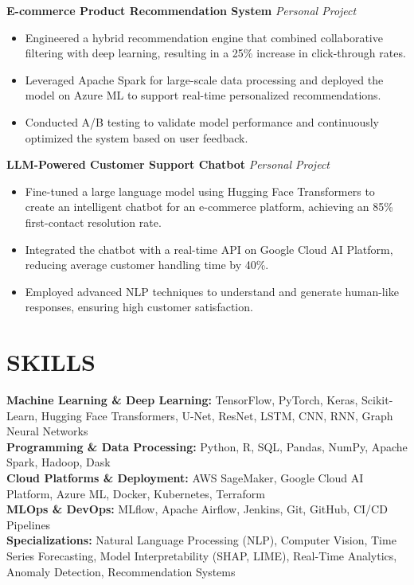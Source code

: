 \documentclass[12pt,a4paper]{article}
\begin{document}
\textbf{E-commerce Product Recommendation System} \hfill \textit{Personal Project}\\
\begin{itemize}[leftmargin=*,noitemsep,topsep=0pt]
  \item Engineered a hybrid recommendation engine that combined collaborative filtering with deep learning, resulting in a 25\% increase in click-through rates.
  \item Leveraged Apache Spark for large-scale data processing and deployed the model on Azure ML to support real-time personalized recommendations.
  \item Conducted A/B testing to validate model performance and continuously optimized the system based on user feedback.
\end{itemize}

\textbf{LLM-Powered Customer Support Chatbot} \hfill \textit{Personal Project}\\
\begin{itemize}[leftmargin=*,noitemsep,topsep=0pt]
  \item Fine-tuned a large language model using Hugging Face Transformers to create an intelligent chatbot for an e-commerce platform, achieving an 85\% first-contact resolution rate.
  \item Integrated the chatbot with a real-time API on Google Cloud AI Platform, reducing average customer handling time by 40\%.
  \item Employed advanced NLP techniques to understand and generate human-like responses, ensuring high customer satisfaction.
\end{itemize}

\section*{SKILLS}

\textbf{Machine Learning \& Deep Learning:} TensorFlow, PyTorch, Keras, Scikit-Learn, Hugging Face Transformers, U-Net, ResNet, LSTM, CNN, RNN, Graph Neural Networks\\[0.3em]
\textbf{Programming \& Data Processing:} Python, R, SQL, Pandas, NumPy, Apache Spark, Hadoop, Dask\\[0.3em]
\textbf{Cloud Platforms \& Deployment:} AWS SageMaker, Google Cloud AI Platform, Azure ML, Docker, Kubernetes, Terraform\\[0.3em]
\textbf{MLOps \& DevOps:} MLflow, Apache Airflow, Jenkins, Git, GitHub, CI/CD Pipelines\\[0.3em]
\textbf{Specializations:} Natural Language Processing (NLP), Computer Vision, Time Series Forecasting, Model Interpretability (SHAP, LIME), Real-Time Analytics, Anomaly Detection, Recommendation Systems
\end{document}
